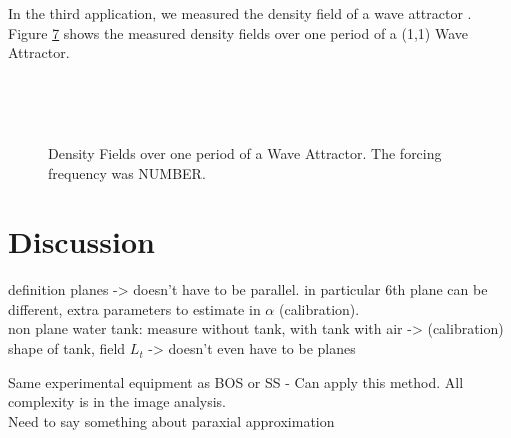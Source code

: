 \documentclass{article}
\begin{document}
In the third application, we measured the density field of a wave attractor \cite{maas1997observation}. Figure \ref{figs:WA0side} shows the measured density fields over one period of a (1,1) Wave Attractor. 
\begin{figure}[htbp]
\begin{subfigure}{.5\linewidth}
		\label{fig:WA0side}
\end{subfigure}%
\begin{subfigure}{.5\linewidth}
		\label{fig:WA6side}
\end{subfigure} \\
\begin{subfigure}{.5\linewidth}
		\label{fig:WA3side}
\end{subfigure}%
\begin{subfigure}{.5\linewidth}
		\label{fig:WA2side}
\end{subfigure} \\
\begin{subfigure}{.5\linewidth}
		\label{fig:WA23side}
\end{subfigure}%
\begin{subfigure}{.5\linewidth}
		\label{fig:WA56side}
\end{subfigure} 
\caption{Density Fields over one period of a Wave Attractor. The forcing frequency was NUMBER. }
\label{figs:WA0side}
\end{figure}

\section{Discussion}

definition planes -> doesn't have to be parallel. in particular 6th plane can be different, extra parameters to estimate in $\alpha$ (calibration). \\
non plane water tank: measure without tank, with tank with air -> (calibration) shape of tank, field $L_t$
-> doesn't even have to be planes

Same experimental equipment as BOS or SS - Can apply this method. All complexity is in the image analysis. \\

Need to say something about paraxial approximation
\end{document}
